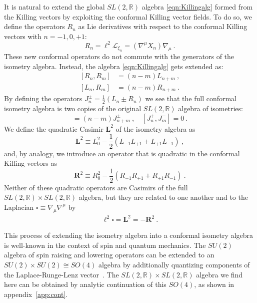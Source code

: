 \documentclass[12pt]{article}
\begin{document}
It is natural to extend the global $SL(2,\mathbb{R})$ algebra \eqref{eqn:Killingalg} formed from the Killing vectors by exploiting the conformal Killing vector fields.  
To do so, we define the operators $R_n$ as Lie derivatives with respect to the conformal Killing vectors with $n = -1, 0, +1$: 
\begin{equation}
	R_n = \ell^2\mathcal{L}_{\xi_n} = (\nabla^\mu X_n) \nabla_\mu~.
\end{equation}
These new conformal operators do not commute with the generators of the isometry algebra.  Instead, the algebra \eqref{eqn:Killingalg} gets extended as:
\begin{equation}\begin{aligned}
	[R_n, R_m] &= (n-m) L_{n+m}~, \\
	[L_n, R_m] &= (n-m) R_{n+m}~.
\label{eq:sl2sl2}
\end{aligned}\end{equation}
By defining the operators $J^\pm_n = \frac{1}{2}\left(L_n \pm  R_n\right)$ we see that the full conformal isometry algebra is two copies of the 
original $SL(2,\mathbb{R})$ algebra of isometries:
\begin{equation}
	[J^\pm_n, J^\pm_m] = (n-m) J^\pm_{n+m}~, \quad [J^+_n, J^-_m] = 0~.
\end{equation}
We define the quadratic Casimir $\mathbf{L}^2$ of the isometry algebra as 
\begin{equation}
\mathbf{L}^2 \equiv L_0^2 - \frac{1}{2}\left( L_{-1} L_{+1} + L_{+1} L_{-1}\right)~,
\end{equation}
and, by analogy, we introduce an operator that is quadratic in the conformal Killing vectors as
\begin{equation}
	\mathbf{R}^2 \equiv R_0^2 - \frac{1}{2}\left( R_{-1} R_{+1} + R_{+1} R_{-1}\right)~.
\end{equation}
Neither of these quadratic operators are Casimirs of the full $SL(2,\mathbb{R}) \times SL(2,\mathbb{R})$ algebra, but they are related to one another and to the Laplacian $\square \equiv \nabla_\mu \nabla^\mu$ by
\begin{equation}\begin{aligned}
	\ell^2 \square = \mathbf{L}^2 = -\mathbf{R}^2~.
\label{eq:l2r2}
\end{aligned}\end{equation}

This process of extending the isometry algebra into a conformal isometry algebra is well-known in the context of spin and quantum mechanics.  The $SU(2)$ algebra of spin raising and lowering operators can be extended to an $SU(2) \times SU(2) \cong SO(4)$ algebra by additionally quantizing components of the Laplace-Runge-Lenz vector~\cite{doi:10.2991/jnmp.2003.10.3.6}.  The $SL(2,\mathbb{R}) \times SL(2,\mathbb{R})$ algebra we find here can be obtained by analytic continuation of this $SO(4)$, as shown in appendix~\ref{app:cont}.
\end{document}
